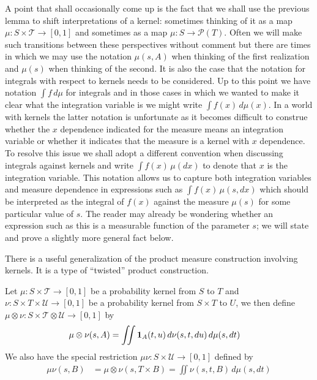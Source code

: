 A point that shall occasionally come up is the fact that we shall use
the previous lemma to shift interpretations of a kernel: sometimes
thinking of it as a map $\mu : S \times \mathcal{T} \to [0,1]$ and
sometimes as a map $\mu : S \to \mathcal{P}(T)$.  Often we will make
such transitions between these perspectives without  comment but there
are times in which we may use the notation $\mu(s,A)$ when thinking of
the first realization and $\mu(s)$ when thinking of the second.  It is
also the case that the notation for integrals with respect to kernels
needs to be considered.  Up to this point we have notation $\int f \,
d\mu$ for integrals and in those cases in which we wanted to make it
clear what the integration variable is we might write $\int f(x) \,
d\mu(x)$.  In a world with kernels the latter notation is unfortunate
as it becomes difficult to construe whether the $x$ dependence indicated
for the measure means an integration variable or whether it
indicates that the measure is a kernel with $x$ dependence.  To resolve
this issue we shall adopt a different convention when discussing
integrals against kernels and write $\int f(x) \, \mu(dx)$ to denote
that $x$ is the integration variable.  This notation allows us to
capture both integration variables and measure dependence in
expressions such as $\int f(x) \, \mu(s, dx)$ which should be
interpreted as the integral of $f(x)$ against the measure $\mu(s)$ for
some particular value of $s$.  The reader may already be wondering
whether an expression such as this is a measurable function of the
parameter $s$; we will state and prove a slightly more general
fact below.

There is a useful generalization of the product measure construction
involving kernels.  It is a type of ``twisted'' product construction.
\begin{defn}Let $\mu : S \times \mathcal{T} \to [0,1]$ be a
  probability kernel from $S$ to $T$ and $\nu : S \times T \times
  \mathcal{U} \to [0,1]$ be a probability kernel from $S \times T$ to
  $U$, we then define $\mu \otimes \nu : S \times \mathcal{T} \otimes
  \mathcal{U} \to [0,1]$ by
\begin{align*}
\mu \otimes \nu(s, A) &= \iint \textbf{1}_{A}(t,u) \,
d\nu(s,t,du) \, d\mu(s, dt)
\end{align*}
We also have the special restriction $\mu \nu : S \times 
  \mathcal{U} \to [0,1]$ defined by 
\begin{align*}
\mu \nu(s, B) &= \mu \otimes  \nu(s, T \times B) = \iint \nu(s,t,B) \, d\mu(s, dt)
\end{align*}
\end{defn}

